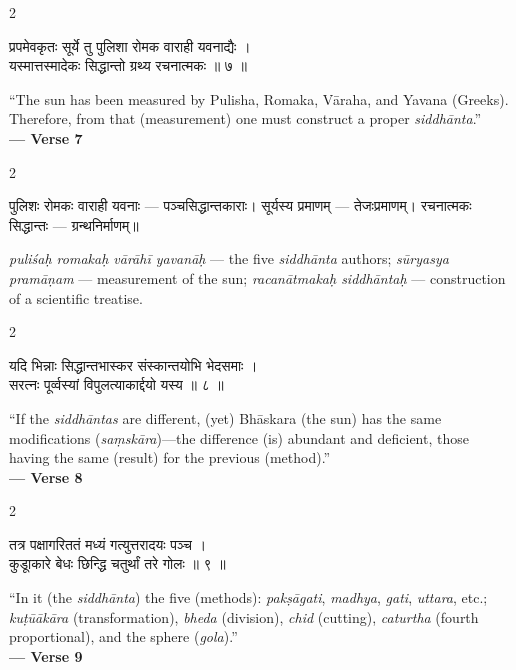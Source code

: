 \documentclass[11pt,a4paper]{article}
\newcommand{\dev}[1]{{\devanagarifont #1}}
\newenvironment{bilingualverse}{%
  \begin{paracol}{2}
  \fontsize{10.5}{13}\selectfont
}{%
  \end{paracol}
  \vspace{0.3cm}
}
\begin{document}
\begin{bilingualverse}
\begin{leftcolumn*}
\dev{प्रपमेवकृतः सूर्ये तु पुलिशा रोमक वाराही यवनाद्यैः ।}\\
\dev{यस्मात्तस्मादेकः सिद्धान्तो ग्रथ्य रचनात्मकः ॥ ७ ॥}
\end{leftcolumn*}
\begin{rightcolumn}
``The sun has been measured by Pulisha, Romaka, Vāraha, and Yavana (Greeks). Therefore, from that (measurement) one must construct a proper \textit{siddhānta}.''\\[0.3cm]
\hfill\textbf{— Verse 7}
\end{rightcolumn}
\end{bilingualverse}

\begin{paracol}{2}
\begin{leftcolumn*}
\dev{पुलिशः रोमकः वाराही यवनाः} — पञ्चसिद्धान्तकाराः। \dev{सूर्यस्य प्रमाणम्} — तेजःप्रमाणम्। \dev{रचनात्मकः सिद्धान्तः} — ग्रन्थनिर्माणम्॥
\end{leftcolumn*}
\begin{rightcolumn}
\textit{puliśaḥ romakaḥ vārāhī yavanāḥ} --- the five \textit{siddhānta} authors; \textit{sūryasya pramāṇam} --- measurement of the sun; \textit{racanātmakaḥ siddhāntaḥ} --- construction of a scientific treatise.
\end{rightcolumn}
\end{paracol}

\vspace{0.3cm}

\begin{bilingualverse}
\begin{leftcolumn*}
\dev{यदि भिन्नाः सिद्धान्तभास्कर संस्कान्तयोभि भेदसमाः ।}\\
\dev{सरत्नः पूर्व्वस्यां विपुलत्याकार्द्दयो यस्य ॥ ८ ॥}
\end{leftcolumn*}
\begin{rightcolumn}
``If the \textit{siddhāntas} are different, (yet) Bhāskara (the sun) has the same modifications (\textit{saṃskāra})---the difference (is) abundant and deficient, those having the same (result) for the previous (method).''\\[0.3cm]
\hfill\textbf{— Verse 8}
\end{rightcolumn}
\end{bilingualverse}

\begin{bilingualverse}
\begin{leftcolumn*}
\dev{तत्र पक्षागरिततं मध्यं गत्युत्तरादयः पञ्च ।}\\
\dev{कुडूाकारे बेधः छिन्द्धि चतुर्थां तरे गोलः ॥ ९ ॥}
\end{leftcolumn*}
\begin{rightcolumn}
``In it (the \textit{siddhānta}) the five (methods): \textit{pakṣāgati}, \textit{madhya}, \textit{gati}, \textit{uttara}, etc.; \textit{kuṭūākāra} (transformation), \textit{bheda} (division), \textit{chid} (cutting), \textit{caturtha} (fourth proportional), and the sphere (\textit{gola}).''\\[0.3cm]
\hfill\textbf{— Verse 9}
\end{rightcolumn}
\end{bilingualverse}
\end{document}
